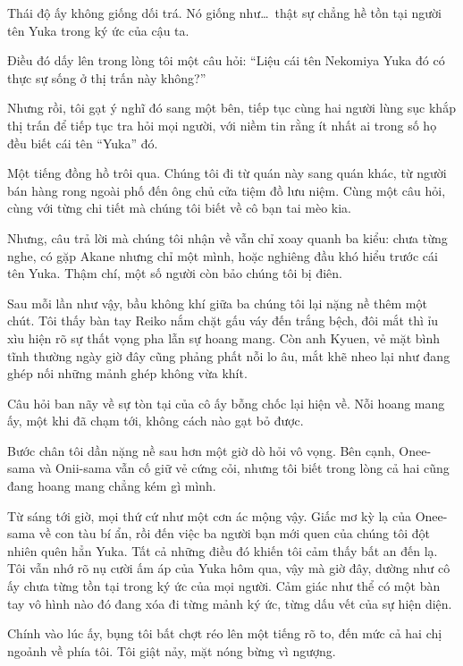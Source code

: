 \documentclass[../main.tex]{subfiles}
\begin{document}
Thái độ ấy không giống dối trá. Nó giống như\dots\ thật sự chẳng hề tồn tại người tên Yuka trong ký ức của cậu ta.

Điều đó dấy lên trong lòng tôi một câu hỏi: ``Liệu cái tên Nekomiya Yuka đó có thực sự sống ở thị trấn này không?''

Nhưng rồi, tôi gạt ý nghĩ đó sang một bên, tiếp tục cùng hai người lùng sục khắp thị trấn để tiếp tục tra hỏi mọi người, với niềm tin rằng ít nhất ai trong số họ đều biết cái tên ``Yuka'' đó.

\ct

Một tiếng đồng hồ trôi qua. Chúng tôi đi từ quán này sang quán khác, từ người bán hàng rong ngoài phố đến ông chủ cửa tiệm đồ lưu niệm. Cùng một câu hỏi, cùng với từng chi tiết mà chúng tôi biết về cô bạn tai mèo kia.

Nhưng, câu trả lời mà chúng tôi nhận về vẫn chỉ xoay quanh ba kiểu: chưa từng nghe, có gặp Akane nhưng chỉ một mình, hoặc nghiêng đầu khó hiểu trước cái tên Yuka. Thậm chí, một số người còn bảo chúng tôi bị điên.

Sau mỗi lần như vậy, bầu không khí giữa ba chúng tôi lại nặng nề thêm một chút. Tôi thấy bàn tay Reiko nắm chặt gấu váy đến trắng bệch, đôi mắt thì ỉu xìu hiện rõ sự thất vọng pha lẫn sự hoang mang. Còn anh Kyuen, vẻ mặt bình tĩnh thường ngày giờ đây cũng phảng phất nỗi lo âu, mắt khẽ nheo lại như đang ghép nối những mảnh ghép không vừa khít.

Câu hỏi ban nãy về sự tòn tại của cô ấy bỗng chốc lại hiện về. Nỗi hoang mang ấy, một khi đã chạm tới, không cách nào gạt bỏ được.


Bước chân tôi dần nặng nề sau hơn một giờ dò hỏi vô vọng. Bên cạnh, Onee-sama và Onii-sama vẫn cố giữ vẻ cứng cỏi, nhưng tôi biết trong lòng cả hai cũng đang hoang mang chẳng kém gì mình.

Từ sáng tới giờ, mọi thứ cứ như một cơn ác mộng vậy. Giấc mơ kỳ lạ của Onee-sama về con tàu bí ẩn, rồi đến việc ba người bạn mới quen của chúng tôi đột nhiên quên hẳn Yuka. Tất cả những điều đó khiến tôi cảm thấy bất an đến lạ. Tôi vẫn nhớ rõ nụ cười ấm áp của Yuka hôm qua, vậy mà giờ đây, dường như cô ấy chưa từng tồn tại trong ký ức của mọi người. Cảm giác như thể có một bàn tay vô hình nào đó đang xóa đi từng mảnh ký ức, từng dấu vết của sự hiện diện.

Chính vào lúc ấy, bụng tôi bất chợt réo lên một tiếng rõ to, đến mức cả hai chị ngoảnh về phía tôi. Tôi giật nảy, mặt nóng bừng vì ngượng.
\end{document}
